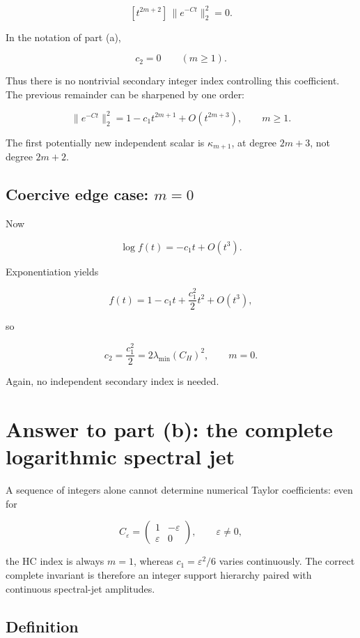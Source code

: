 \documentclass[11pt,a4paper]{article}
\begin{document}
\[
\boxed{
 [t^{2m+2}]\,\|e^{-Ct}\|_2^2=0.
}
\]

In the notation of part (a),

\[
\boxed{c_2=0\qquad(m\ge1).}
\]

Thus there is no nontrivial secondary integer index controlling this coefficient. The previous remainder can be sharpened by one order:

\[
\boxed{
\|e^{-Ct}\|_2^2=1-c_1t^{2m+1}+O(t^{2m+3}),\qquad m\ge1.
}
\]

The first potentially new independent scalar is \(\kappa_{m+1}\), at degree \(2m+3\), not degree \(2m+2\).

\subsection{\texorpdfstring{Coercive edge case: \(m=0\)}{Coercive edge case: m=0}}\label{coercive-edge-case-m0}

Now

\[
\log f(t)=-c_1t+O(t^3).
\]

Exponentiation yields

\[
f(t)=1-c_1t+\frac{c_1^2}{2}t^2+O(t^3),
\]

so

\[
\boxed{
 c_2=\frac{c_1^2}{2}=2\lambda_{\min}(C_H)^2,
 \qquad m=0.
}
\]

Again, no independent secondary index is needed.

\section{Answer to part (b): the complete logarithmic spectral jet}\label{answer-to-part-b-the-complete-logarithmic-spectral-jet}

A sequence of integers alone cannot determine numerical Taylor coefficients: even for

\[
C_\varepsilon=
\begin{pmatrix}
1&-\varepsilon\\
\varepsilon&0
\end{pmatrix},\qquad \varepsilon\ne0,
\]

the HC index is always \(m=1\), whereas \(c_1=\varepsilon^2/6\) varies continuously. The correct complete invariant is therefore an integer support hierarchy paired with continuous spectral-jet amplitudes.

\subsection{Definition}\label{definition}
\end{document}
